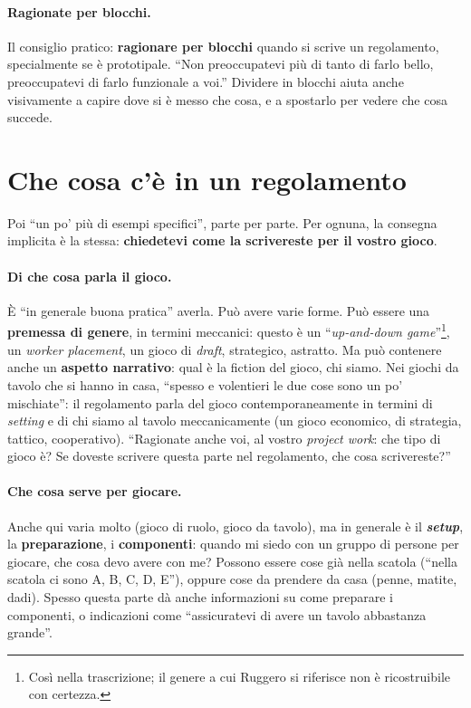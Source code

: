 \paragraph{Ragionate per blocchi.} Il consiglio pratico: \textbf{ragionare per blocchi}
quando si scrive un regolamento, specialmente se è prototipale. ``Non preoccupatevi più
di tanto di farlo bello, preoccupatevi di farlo funzionale a voi.'' Dividere in blocchi
aiuta anche visivamente a capire dove si è messo che cosa, e a spostarlo per vedere che
cosa succede.

\section{Che cosa c'è in un regolamento}
\label{a12:sec:contenuti}



Poi ``un po' più di esempi specifici'', parte per parte. Per ognuna, la consegna implicita
è la stessa: \textbf{chiedetevi come la scrivereste per il vostro gioco}.

\paragraph{Di che cosa parla il gioco.} È ``in generale buona pratica'' averla. Può avere
varie forme. Può essere una \textbf{premessa di genere}, in termini meccanici: questo è
un ``\emph{up-and-down game}''\footnote{Così nella trascrizione; il genere a cui Ruggero
si riferisce non è ricostruibile con certezza.}, un \emph{worker placement}, un gioco di \emph{draft},
strategico, astratto. Ma può contenere anche un \textbf{aspetto narrativo}: qual è la
fiction del gioco, chi siamo. Nei giochi da tavolo che si hanno in casa, ``spesso e
volentieri le due cose sono un po' mischiate'': il regolamento parla del gioco
contemporaneamente in termini di \emph{setting} e di chi siamo al tavolo meccanicamente
(un gioco economico, di strategia, tattico, cooperativo). ``Ragionate anche voi, al
vostro \emph{project work}: che tipo di gioco è? Se doveste scrivere questa parte nel
regolamento, che cosa scrivereste?''

\paragraph{Che cosa serve per giocare.} Anche qui varia molto (gioco di ruolo, gioco da
tavolo), ma in generale è il \textbf{\emph{setup}}, la \textbf{preparazione}, i
\textbf{componenti}: quando mi siedo con un gruppo di persone per giocare, che cosa devo
avere con me? Possono essere cose già nella scatola (``nella scatola ci sono A, B, C, D,
E''), oppure cose da prendere da casa (penne, matite, dadi). Spesso questa parte dà
anche informazioni su come preparare i componenti, o indicazioni come ``assicuratevi di
avere un tavolo abbastanza grande''.

